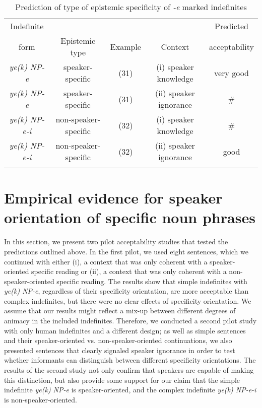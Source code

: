 \documentclass[output=paper]{langsci/langscibook}
\begin{document}
\begin{table}[H]
\centering
{\small{
\begin{tabular}{ccccc}
\lsptoprule
Indefinite 	& 	 			& 	 		& 	 	& {Predicted} \\
form 		& Epistemic type 	& Example 	& Context 	& {acceptability} \\
\midrule
{\emph{ye(k) NP-e}}		& speaker-specific		& (31)	& {(i) speaker knowledge}	& very good \\
{\emph{ye(k) NP-e}}		& speaker-specific		& (31)	& {(ii) speaker ignorance}	& \# \\
{{\emph{ye(k) NP-e-i}}}	& {non-speaker-specific}	& (32)	& {(i) speaker knowledge}	& \# \\
{{\emph{ye(k) NP-e-i}}}	& {non-speaker-specific	}& (32)	& {(ii) speaker ignorance}	& good \\
\lspbottomrule
\end{tabular}
}}
\caption{{Prediction of type of epistemic specificity of {\emph{-e}} marked indefinites}}\label{4table:6}
\end{table}



\section{Empirical evidence for speaker orientation of specific noun phrases}\label{4sec:5}

{
In this section, we present two pilot acceptability studies that tested the predictions outlined above. In the first pilot, we used eight sentences, which we continued with either (i), a context that was only coherent with a speaker-oriented specific reading or (ii), a context that was only coherent with a non-speaker-oriented specific reading. The results show that simple indefinites with {\emph{ye(k) NP-e}}, regardless of their specificity orientation, are more acceptable than complex indefinites, but there were no clear effects of specificity orientation. We assume that our results might reflect a mix-up between different degrees of animacy in the included indefinites. Therefore, we conducted a second pilot study with only human indefinites and a different design; as well as simple sentences and their speaker-oriented vs. non-speaker-oriented continuations, we also presented sentences that clearly signaled speaker ignorance in order to test whether informants can distinguish between different specificity orientations. The results of the second study not only confirm that speakers are capable of making this distinction, but also provide some support for our claim that the simple indefinite {\emph{ye(k) NP-e}} is speaker-oriented, and the complex indefinite {\emph{ye(k) NP-e-i}} is non-speaker-oriented.
}
\end{document}
